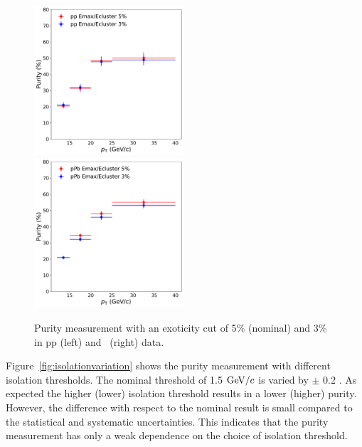 \begin{figure}
	\center
	\includegraphics[width=0.495\textwidth]{Checks_Systematics/ppemax.pdf}
	\includegraphics[width=0.495\textwidth]{Checks_Systematics/ppbemax.pdf}
	\caption{Purity measurement with an exoticity cut of 5$\%$ (nominal) and 3$\%$ in pp (left) and \pPb~(right) data.}
	\label{fig:exoticity}
\end{figure}

Figure~\ref{fig:isolationvariation} shows the purity measurement with different isolation thresholds. The nominal threshold of 1.5 $\mathrm{GeV}/c$ is varied by $\pm$ 0.2 \GeVc. As expected the higher (lower) isolation threshold results in a lower (higher) purity. However, the difference with respect to the nominal result is small compared to the statistical and systematic uncertainties. This indicates that the purity measurement has only a weak dependence on the choice of isolation threshold. 



